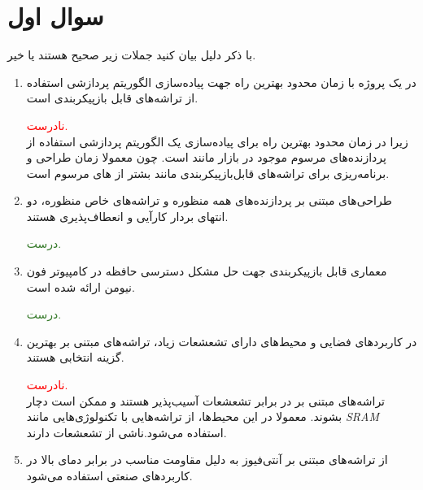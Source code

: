 \section{سوال اول}

با ذکر دلیل بیان کنید جملات زیر صحیح هستند یا خیر.

\begin{enumerate}
	\item 
	در یک پروژه با زمان محدود بهترین راه جهت پیاده‌سازی الگوریتم پردازشی استفاده از تراشه‌های قابل بازپیکربندی است.
	\begin{qsolve}
		\textcolor{red}{نادرست.}\\
		زیرا در زمان محدود بهترین راه برای پیاده‌سازی یک الگوریتم پردازشی استفاده از پردازنده‌های مرسوم موجود در بازار مانند  است. چون معمولا زمان طراحی و برنامه‌ریزی برای تراشه‌های قابل‌بازپیکربندی مانند  بشتر از  های مرسوم است.
	\end{qsolve}
	
	
	
	\item 
	طراحی‌های مبتنی بر پردازنده‌های همه منظوره و تراشه‌های خاص منظوره، دو انتهای بردار کارآیی و انعطاف‌پذیری هستند.
	\begin{qsolve}
		\textcolor[HTML]{347928}{درست.}\\
	\end{qsolve}
	
	
	
	\item 
	معماری قابل بازپیکربندی جهت حل مشکل دسترسی حافظه در کامپیوتر فون نیومن ارائه شده است.
	\begin{qsolve}
		\textcolor[HTML]{347928}{درست.}\\
	\end{qsolve}
	
	
	
	\item 
	در کاربردهای فضایی و محیط‌های دارای تشعشعات زیاد، تراشه‌های مبتنی بر  بهترین گزینه انتخابی هستند.
	\begin{qsolve}
		\textcolor{red}{نادرست.}\\
		تراشه‌های مبتنی بر  در برابر تشعشعات آسیب‌پذیر هستند و ممکن است دچار  بشوند. معمولا در این محیط‌ها، از تراشه‌هایی با تکنولوژی‌هایی مانند \textit{SRAM} استفاده می‌شود.ناشی از تشعشعات دارند.
	\end{qsolve}
	
	
	
	
	\item 
	از تراشه‌های مبتنی بر آنتی‌فیوز به دلیل مقاومت مناسب در برابر دمای بالا در کاربردهای صنعتی استفاده می‌شود.
	\begin{qsolve}
		

\end{qsolve}
\end{enumerate}
